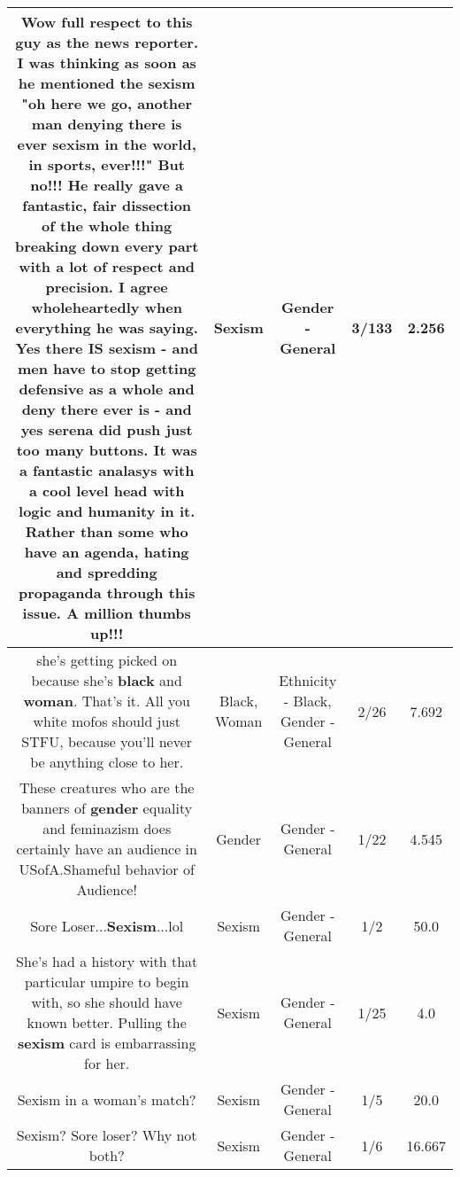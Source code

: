 \documentclass[11pt]{article}
\newlength\mylength
\begin{document}
\begin{center}
\begin{longtable}{|C{.65\mylength}|C{.30\mylength}|C{.12\mylength}|C{.12\mylength}|C{.12\mylength}|}
  \small Wow full respect to this guy as the news reporter. I was thinking as soon as he mentioned the \textbf{sexism} "oh here we go, another man denying there is ever \textbf{sexism} in the world, in sports, ever!!!" But no!!! He really gave a fantastic, fair dissection of the whole thing breaking down every part with a lot of respect and precision. I agree wholeheartedly when everything he was saying. Yes there IS \textbf{sexism} - and men have to stop getting defensive as a whole and deny there ever is - and yes serena did push just too many buttons. It was a fantastic analasys with a cool level head with logic and humanity in it. Rather than some who have an agenda, hating and spredding propaganda through this issue. A million thumbs up!!!\normalsize   & Sexism & Gender - General & 3/133 & 2.256 \\  \hline
  \small she's getting picked on because she's \textbf{black} and \textbf{woman}.  That's it.  All you white mofos should just STFU, because you'll never be anything close to her.\normalsize   & Black, Woman & Ethnicity - Black, Gender - General & 2/26 & 7.692 \\  \hline
  \small These creatures who are the banners of \textbf{gender} equality and feminazism does certainly have an audience in USofA.Shameful behavior of Audience!\normalsize   & Gender & Gender - General & 1/22 & 4.545 \\  \hline
  \small Sore Loser...\textbf{Sexism}...lol\normalsize   & Sexism & Gender - General & 1/2 & 50.0 \\  \hline
  \small She's had a history with that particular umpire to begin with, so she should have known better. Pulling the \textbf{sexism} card is embarrassing for her.\normalsize   & Sexism & Gender - General & 1/25 & 4.0 \\  \hline
  \small Sexism in a woman's match?\normalsize   & Sexism & Gender - General & 1/5 & 20.0 \\  \hline
  \small Sexism? Sore loser? Why not both?\normalsize   & Sexism & Gender - General & 1/6 & 16.667 \\  \hline

\end{longtable}
\end{center}
\end{document}

